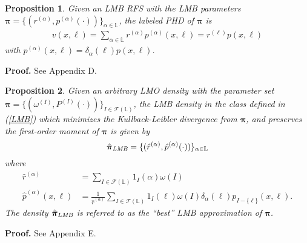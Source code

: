 \documentclass[journal]{IEEEtran}
\newcommand{\bpi}{{\boldsymbol\pi}}
\newtheorem{Pro}{Proposition}
\newcommand{\proproof}[1]{\noindent\textbf{Proof. } See Appendix #1.}
\begin{document}
{\begin{Pro}\label{pro:4}
Given an LMB RFS  with the LMB parameters $\bpi=\{(r^{(\alpha)},p^{(\alpha)}(\cdot))\}_{\alpha\in\mathbb{L}}$, the labeled PHD of $\bpi$ is
\begin{equation}\label{labeled-PHD-LMB}
\begin{split}
v(x,\ell)={\sum}_{\alpha\in\mathbb{L}}r^{(\alpha)}p^{(\alpha)}(x,\ell)=r^{(\ell)}p(x,\ell)
\end{split}
\end{equation}
with 
$p^{(\alpha)}(x,\ell)=\delta_{\alpha}(\ell)p(x,\ell)$.
\end{Pro}

\proproof{D}




\begin{Pro}\label{pro:5}
Given an arbitrary LMO density with the parameter set $\bpi=\{(\omega^{(I)},P^{(I)}(\cdot))\}_{I\in\mathcal{F}(\mathbb{L})}$,
the LMB  density in the class defined in (\ref{LMB}) which minimizes the Kullback-Leibler divergence from $\bpi$, and  preserves the first-order moment of $\bpi$ is given by $$\hat{\bpi}_{\emph{LMB}}=\{(\hat r^{(\alpha)},\hat p^{(\alpha)}(\cdot))\}_{\alpha\in\mathbb{L}}$$ where 
\begin{align}
\label{LMB_where_r} \hat r^{(\alpha)}&={\sum}_{I\in\mathcal{F}(\mathbb{L})}1_I(\alpha)\omega(I)\\
\label{LMB_where_p} \hat p^{(\alpha)}(x,\!\ell)&\!=\!\frac{1}{\hat r^{(\alpha)}}{\sum}_{I\in\mathcal{F}(\mathbb{L})}1_I(\ell)\omega(I)\delta_{\alpha}(\ell) p_{I-\{\ell\}}(x,\!\ell).
\end{align}
The density $\hat{\bpi}_{\emph{LMB}}$ is referred to as the ``best'' LMB approximation of $\bpi$.
\end{Pro}

\proproof{E}
}
\end{document}
